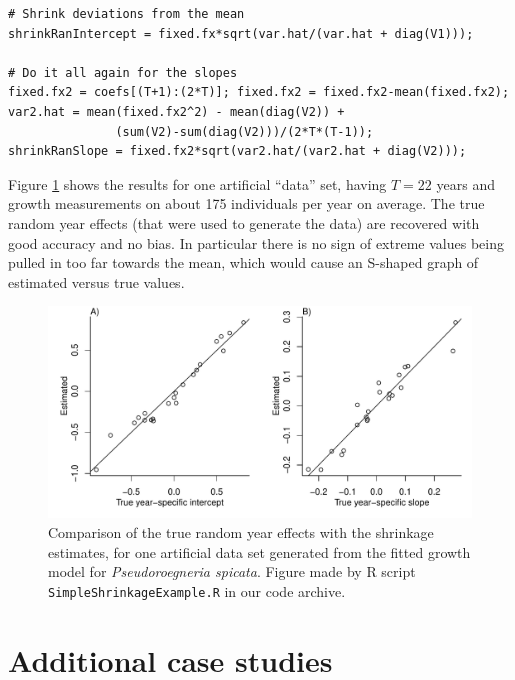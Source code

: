 \documentclass[12pt]{article}
\begin{document}
\begin{spacing}{1.35}
\begin{lstlisting}
# Shrink deviations from the mean 
shrinkRanIntercept = fixed.fx*sqrt(var.hat/(var.hat + diag(V1)));

# Do it all again for the slopes 
fixed.fx2 = coefs[(T+1):(2*T)]; fixed.fx2 = fixed.fx2-mean(fixed.fx2); 
var2.hat = mean(fixed.fx2^2) - mean(diag(V2)) + 
               (sum(V2)-sum(diag(V2)))/(2*T*(T-1)); 
shrinkRanSlope = fixed.fx2*sqrt(var2.hat/(var2.hat + diag(V2))); 
\end{lstlisting}

Figure \ref{fig:compareShrinkage} shows the results for one artificial ``data'' set, having $T=22$ years and growth measurements on 
about 175 individuals per year on average. The true random year effects (that were used to generate the data) are recovered
with good accuracy and no bias. In particular there is no sign of extreme values being pulled in too far
towards the mean, which would cause an S-shaped graph of estimated versus true values. 

\begin{figure}[tbp]
\centerline{\includegraphics[width=\textwidth]{figures/SimpleShrinkage.pdf}}
\caption{Comparison of the true random year effects with the shrinkage estimates, for one artificial data set
generated from the fitted growth model for  \emph{Pseudoroegneria spicata}. Figure made by R script 
\texttt{SimpleShrinkageExample.R} in our code archive.} 
\label{fig:compareShrinkage}
\end{figure}


\section{Additional case studies}
\label{sec:moreCases}


\end{spacing}
\end{document}
